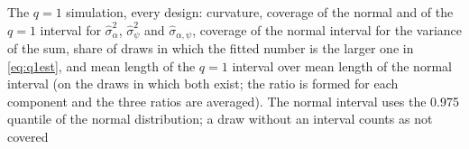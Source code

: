 \begin{table}[H]
\centering\footnotesize\setlength{\tabcolsep}{4.2pt}
\caption{The $q=1$ simulation, every design: curvature, coverage of the normal and of the $q=1$ interval for
$\hat\sigma^2_\alpha$, $\hat\sigma^2_\psi$ and $\hat\sigma_{\alpha,\psi}$, coverage of the normal interval for the
variance of the sum, share of draws in which the fitted number is the larger one in \eqref{eq:q1est}, and mean
length of the $q=1$ interval over mean length of the normal interval (on the draws in which both exist; the
ratio is formed for each component and the three ratios are averaged). The normal interval uses the 0.975
quantile of the normal distribution; a draw without an interval counts as not covered}\label{tab:q1cells}
\end{table}

